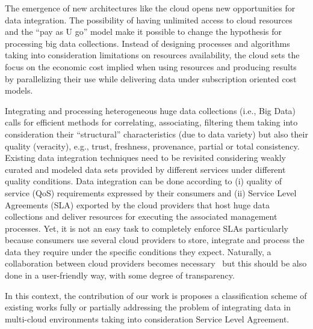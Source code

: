The emergence of new architectures like the cloud opens new opportunities for data integration. 
The possibility of having unlimited access to cloud resources and the ``pay as U go'' model make it possible to change the hypothesis for processing big  data collections.  Instead of designing processes and algorithms taking into consideration  limitations on resources availability, the cloud sets the focus on the economic cost implied when using resources and producing results by parallelizing their use while delivering data under subscription oriented cost models.
 
Integrating and processing heterogeneous huge data collections (i.e., Big Data) calls for efficient methods for correlating, associating, filtering them taking into consideration their ``structural'' characteristics (due to data variety) but also their quality (veracity), e.g., trust, freshness, provenance, partial or total consistency. 
Existing data integration techniques need to be revisited considering weakly curated and modeled data sets provided by different services under different quality conditions. Data integration can be done according to  (i) quality of service (QoS) requirements expressed by their consumers and (ii) Service Level Agreements (SLA)  exported by the cloud providers that host  huge data collections and deliver resources for executing the associated management processes. Yet, it is not an easy task to completely enforce SLAs particularly because consumers use several cloud providers to store, integrate and process the data they require under the specific conditions they expect.
Naturally, a collaboration between cloud providers becomes necessary~\cite{036} but this should be also done in a user-friendly way, with some degree of transparency. 

 
In this context, the contribution of our work is
proposes a classification scheme of existing works fully or partially addressing
the problem of integrating data in multi-cloud environments  taking into
consideration Service Level Agreement. 

